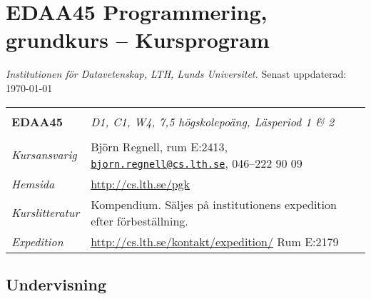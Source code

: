 \documentclass[a4paper,12pt,oneside]{memoir}
\newcommand{\YEAR}{\CurrentYear}
\begin{document}


\section*{EDAA45 Programmering, grundkurs  -- Kursprogram \YEAR}
\emph{Institutionen för Datavetenskap, LTH, Lunds Universitet.} Senast uppdaterad: \today\\

\begin{longtable}[l]{ll}
\hline\\[-0.75em]%

\textbf{EDAA45} & \textit {D1, C1, W4, 7,5 högskolepoäng, Läsperiod 1 \& 2} \\[-0.75em] \tabularnewline
\hline%
\endhead
\emph{Kursansvarig}   & Björn Regnell, rum E:2413,
                        \href{mailto:bjorn.regnell@cs.lth.se}
                        {\nolinkurl{bjorn.regnell@cs.lth.se}},
                        046--222 90 09\tabularnewline
                        \emph{Hemsida}        
                        & \url{http://cs.lth.se/pgk}\tabularnewline
\emph{Kurslitteratur} & Kompendium. Säljes på institutionens expedition efter förbeställning.\tabularnewline
\emph{Expedition}     & \url{http://cs.lth.se/kontakt/expedition/} Rum E:2179
                        \tabularnewline

\hline
\end{longtable}

\subsection{Undervisning}\label{undervisning}
\end{document}
